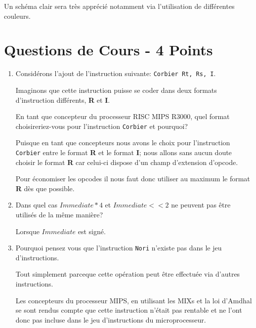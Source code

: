 Un sch\'ema clair sera tr\`es appr\'eci\'e notamment via l'utilisation
de diff\'erentes couleurs.

%
%

\section{Questions de Cours - 4 Points}

\begin{enumerate}
  \item
    Consid\'erons l'ajout de l'instruction suivante:
    \texttt{Corbier Rt, Rs, I}.

    Imaginons que cette instruction puisse se coder dans deux formats
    d'instruction diff\'erents, \textbf{R} et \textbf{I}.

    En tant que concepteur du processeur RISC MIPS R3000, quel
    format choisireriez-vous pour l'instruction \texttt{Corbier} et pourquoi?

    \begin{correction}

      Puisque en tant que concepteurs nous avons le choix pour l'instruction
      \texttt{Corbier} entre le format \textbf{R} et le format \textbf{I};
      nous allons sans aucun doute choisir le format \textbf{R} car celui-ci
      dispose d'un champ d'extension d'opcode.

      Pour \'economiser les opcodes il nous faut donc utiliser au maximum
      le format \textbf{R} d\`es que possible.

    \end{correction}
  \item
    Dans quel cas $Immediate * 4$ et $Immediate << 2$ ne peuvent pas \^etre
    utilis\'es de la m\^eme mani\`ere?

    \begin{correction}

      Lorsque $Immediate$ est sign\'e.

    \end{correction}
  \item
    Pourquoi pensez vous que l'instruction \texttt{Nori} n'existe pas dans
    le jeu d'instructions.

    \begin{correction}

      Tout simplement parceque cette op\'eration peut \^etre effectu\'ee
      via d'autres instructions.

      Les concepteurs du processeur MIPS, en utilisant les MIXs et la
      loi d'Amdhal se sont rendus compte que cette instruction n'\'etait
      pas rentable et ne l'ont donc pas incluse dans le jeu d'instructions
      du microprocesseur.


\end{correction}
\end{enumerate}

